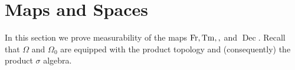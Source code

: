 \documentclass[reqno,draft]{amsart}
\numberwithin{equation}{section}
\theoremstyle{plain}
\theoremstyle{remark}
\DeclareMathOperator{\fr}{Fr}
\DeclareMathOperator{\tm}{Tm}
\let\sp\relax %
\DeclareMathOperator{\sp}{Sp}
\DeclareMathOperator{\dc}{Dec}
\begin{document}
%
%     


\appendix
\section{Maps and Spaces}
In this section we prove measurability of the maps $\fr, \tm, \sp,$ and $\dc$. Recall that $\Omega$ and $\Omega_0$ are equipped with the product topology and (consequently) the product $\sigma$ algebra.
\end{document}
